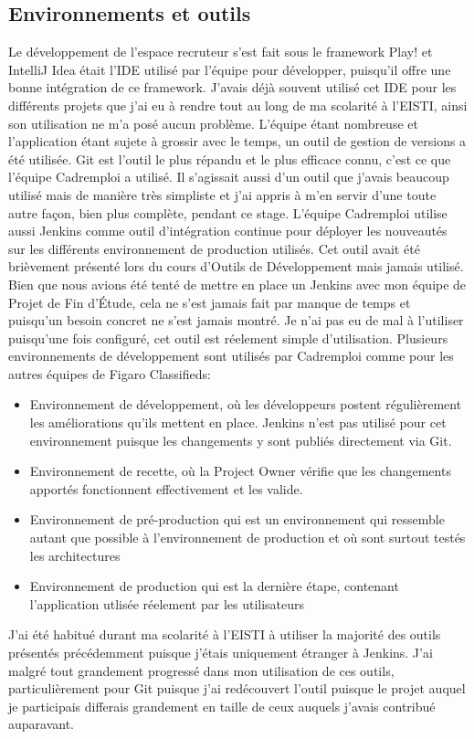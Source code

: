 \subsection{Environnements et outils}
Le développement de l'espace recruteur s'est fait sous le framework Play! et IntelliJ Idea était l'IDE utilisé par l'équipe pour développer, puisqu'il offre une bonne intégration de ce framework.
J'avais déjà souvent utilisé cet IDE pour les différents projets que j'ai eu à rendre tout au long de ma scolarité à l'EISTI, ainsi son utilisation ne m'a posé aucun problème.
L'équipe étant nombreuse et l'application étant sujete à grossir avec le temps, un outil de gestion de versions a été utilisée.
Git est l'outil le plus répandu et le plus efficace connu, c'est ce que l'équipe Cadremploi a utilisé.
Il s'agissait aussi d'un outil que j'avais beaucoup utilisé mais de manière très simpliste et j'ai appris à m'en servir d'une toute autre façon, bien plus complète, pendant ce stage.
L'équipe Cadremploi utilise aussi Jenkins comme outil d'intégration continue pour déployer les nouveautés sur les différents environnement de production utilisés.
Cet outil avait été brièvement présenté lors du cours d'Outils de Développement mais jamais utilisé.
Bien que nous avions été tenté de mettre en place un Jenkins avec mon équipe de Projet de Fin d'Étude, cela ne s'est jamais fait par manque de temps et puisqu'un besoin concret ne s'est jamais montré.
Je n'ai pas eu de mal à l'utiliser puisqu'une fois configuré, cet outil est réelement simple d'utilisation.
Plusieurs environnements de développement sont utilisés par Cadremploi comme pour les autres équipes de Figaro Classifieds:
\begin{itemize}
  \item{Environnement de développement}, où les développeurs postent régulièrement les améliorations qu'ils mettent en place. Jenkins n'est pas utilisé pour cet environnement puisque les changements y sont publiés directement via Git.
  \item{Environnement de recette}, où la Project Owner vérifie que les changements apportés fonctionnent effectivement et les valide.
  \item{Environnement de pré-production} qui est un environnement qui ressemble autant que possible à l'environnement de production et où sont surtout testés les architectures
  \item{Environnement de production} qui est la dernière étape, contenant l'application utlisée réelement par les utilisateurs
\end{itemize}
J'ai été habitué durant ma scolarité à l'EISTI à utiliser la majorité des outils présentés précédemment puisque j'étais uniquement étranger à Jenkins. J'ai malgré tout grandement progressé dans mon utilisation de ces outils, particulièrement pour Git puisque j'ai redécouvert l'outil puisque le projet auquel je participais differais grandement en taille de ceux auquels j'avais contribué auparavant.
